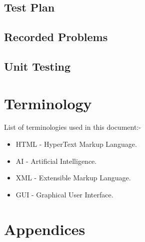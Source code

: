 \documentclass[conference]{IEEEtran}
\begin{document}
      \subsection{Test Plan}

      \subsection{Recorded Problems}

      \subsection{Unit Testing}

    \section{Terminology}
      List of terminologies used in this document:-
      \begin{itemize}
        \item HTML - HyperText Markup Language.
        \item AI - Artificial Intelligence.
        \item XML - Extensible Markup Language.
        \item GUI - Graphical User Interface.
      \end{itemize}
  
    \section{Appendices}

  \nocite{*}
	\renewcommand\refname{\section{Reference List}}
	\small{
    }
\end{document}
